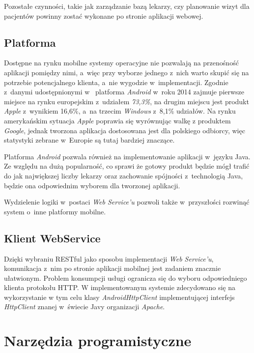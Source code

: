 \documentclass[11pt]{aghdpl}
\begin{document}
Pozostałe czynności, takie jak zarządzanie bazą lekarzy, czy planowanie wizyt dla pacjentów powinny zostać wykonane po stronie aplikacji webowej.

\subsection{Platforma}

Dostępne na rynku mobilne systemy operacyjne nie pozwalają na przenośność aplikacji pomiędzy nimi, a~więc przy wyborze jednego z~nich warto skupić się na potrzebie potencjalnego klienta, a~nie wygodzie w~implementacji. Zgodnie z~danymi udostępnionymi w~\cite{AMS} platforma \emph{Android} w~roku 2014 zajmuje pierwsze miejsce na rynku europejskim z~udziałem \emph{73,3\%}, na drugim miejscu jest produkt \emph{Apple} z~wynikiem 16,6\%, a~na trzecim \emph{Windows} z~8,1\% udziałów. Na rynku amerykańskim sytuacja \emph{Apple} poprawia się wyrównując walkę z produktem \emph{Google}, jednak tworzona aplikacja dostosowana jest dla polskiego odbiorcy, więc statystyki zebrane w~Europie są tutaj bardziej znaczące.

Platforma \emph{Android} pozwala również na implementowanie aplikacji w~języku Java. Ze względu na dużą popularność, co sprawi że gotowy produkt będzie mógł trafić do jak największej liczby lekarzy oraz zachowanie spójności z~technologią Java, będzie ona odpowiednim wyborem dla tworzonej aplikacji.

Wydzielenie logiki w~postaci \emph{Web Service'u} pozwoli także w~przyszłości rozwinąć system o~inne platformy mobilne.

\subsection{Klient WebService}

Dzięki wybraniu RESTful jako sposobu implementacji \emph{Web Service'u}, komunikacja z~nim po stronie aplikacji mobilnej jest zadaniem znacznie ułatwionym. Problem konsumpcji usługi ogranicza się do wyboru odpowiedniego klienta protokołu HTTP. W implementowanym systemie zdecydowano się na wykorzystanie w tym celu klasy \emph{AndroidHttpClient} implementującej interfejs \emph{HttpClient} znanej w~świecie Javy organizacji \emph{Apache}.

\section{Narzędzia programistyczne}
\end{document}

